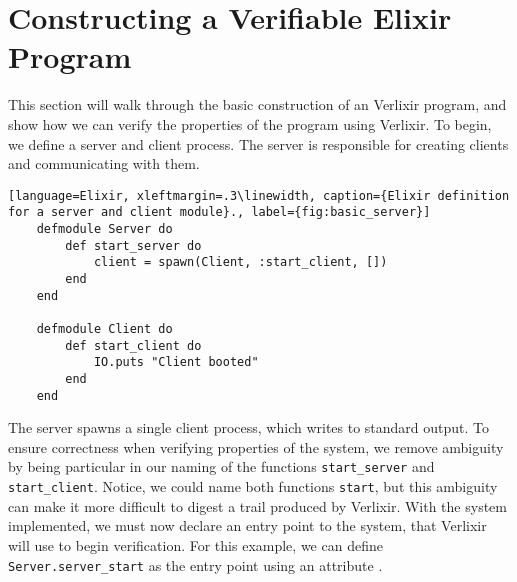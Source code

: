 \section{Constructing a Verifiable Elixir Program} \label{sec:verifiable}
This section will walk through the basic construction of an Verlixir program, and show how we can verify the properties of the program using Verlixir. To begin, we define a server and client process. The server is responsible for creating clients and communicating with them. 
\begin{lstlisting}[language=Elixir, xleftmargin=.3\linewidth, caption={Elixir definition for a server and client module}., label={fig:basic_server}]
    defmodule Server do
        def start_server do
            client = spawn(Client, :start_client, [])
        end
    end

    defmodule Client do
        def start_client do
            IO.puts "Client booted"
        end
    end
\end{lstlisting}
The server spawns a single client process, which writes to standard output. To ensure correctness when verifying properties of the system, we remove ambiguity by being particular in our naming of the functions \texttt{start\_server} and \texttt{start\_client}. Notice, we could name both functions \texttt{start}, but this ambiguity can make it more difficult to digest a trail produced by Verlixir. With the system implemented, we must now declare an entry point to the system, that Verlixir will use to begin verification. For this example, we can define \texttt{Server.server\_start} as the entry point using an attribute \texttt{\@init}.

